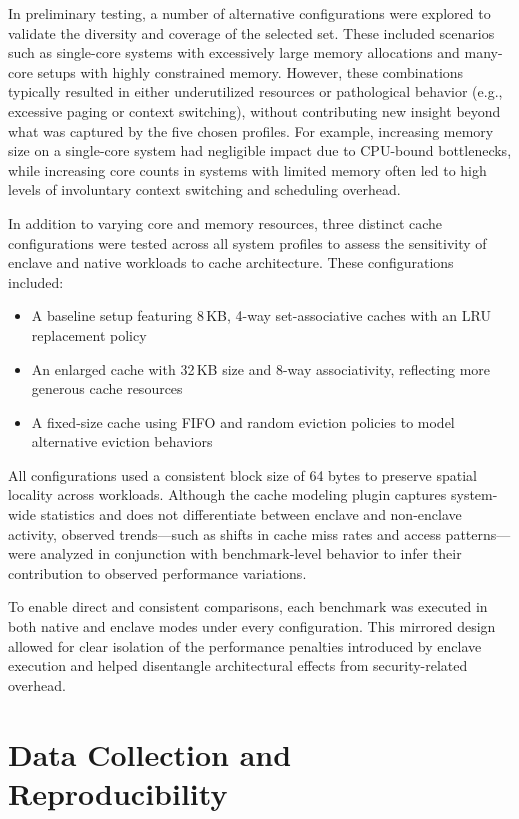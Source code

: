 In preliminary testing, a number of alternative configurations were explored to validate the diversity and coverage of the selected set. These included scenarios such as single-core systems with excessively large memory allocations and many-core setups with highly constrained memory. However, these combinations typically resulted in either underutilized resources or pathological behavior (e.g., excessive paging or context switching), without contributing new insight beyond what was captured by the five chosen profiles. For example, increasing memory size on a single-core system had negligible impact due to CPU-bound bottlenecks, while increasing core counts in systems with limited memory often led to high levels of involuntary context switching and scheduling overhead.

In addition to varying core and memory resources, three distinct cache configurations were tested across all system profiles to assess the sensitivity of enclave and native workloads to cache architecture. These configurations included:

\begin{itemize}
    \item A baseline setup featuring 8\,KB, 4-way set-associative caches with an LRU replacement policy
    \item An enlarged cache with 32\,KB size and 8-way associativity, reflecting more generous cache resources
    \item A fixed-size cache using FIFO and random eviction policies to model alternative eviction behaviors
\end{itemize}

All configurations used a consistent block size of 64 bytes to preserve spatial locality across workloads. Although the cache modeling plugin captures system-wide statistics and does not differentiate between enclave and non-enclave activity, observed trends—such as shifts in cache miss rates and access patterns—were analyzed in conjunction with benchmark-level behavior to infer their contribution to observed performance variations.

To enable direct and consistent comparisons, each benchmark was executed in both native and enclave modes under every configuration. This mirrored design allowed for clear isolation of the performance penalties introduced by enclave execution and helped disentangle architectural effects from security-related overhead.

\section{Data Collection and Reproducibility}
\label{sec:data-collection}

